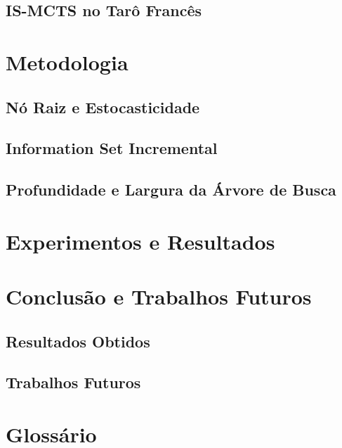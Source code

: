 \documentclass[12pt]{article}
\begin{document}
\subsection{IS-MCTS no Tarô Francês}

\section{Metodologia}

\subsection{Nó Raiz e Estocasticidade}

\subsection{Information Set Incremental}

\subsection{Profundidade e Largura da Árvore de Busca}

\section{Experimentos e Resultados}

\section{Conclusão e Trabalhos Futuros}

\subsection{Resultados Obtidos}

\subsection{Trabalhos Futuros}

\section{Glossário}
\end{document}
